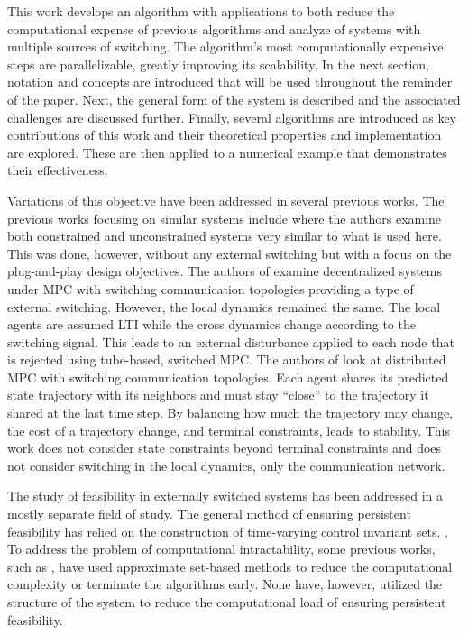 This work develops an algorithm with applications to both reduce the computational expense of previous algorithms and analyze of systems with multiple sources of switching. The algorithm's most computationally expensive steps are parallelizable, greatly improving its scalability. In the next section, notation and concepts are introduced that will be used throughout the reminder of the paper. Next, the general form of the system is described and the associated challenges are discussed further. Finally, several algorithms are introduced as key contributions of this work and their theoretical properties and implementation are explored. These are then applied to a numerical example that demonstrates their effectiveness. 

Variations of this objective have been addressed in several previous works. The previous works focusing on similar systems include \cite{Riverso2015} where the authors examine both constrained and unconstrained systems very similar to what is used here. This was done, however, without any external switching but with a focus on the plug-and-play design objectives. The authors of \cite{Ahandani2020} examine decentralized systems under MPC with switching communication topologies providing a type of external switching. However, the local dynamics remained the same. The local agents are assumed LTI while the cross dynamics change according to the switching signal. This leads to an external disturbance applied to each node that is rejected using tube-based, switched MPC. The authors of \cite{Li2020} look at distributed MPC with switching communication topologies. Each agent shares its predicted state trajectory with its neighbors and must stay ``close'' to the trajectory it shared at the last time step. By balancing how much the trajectory may change, the cost of a trajectory change, and terminal constraints, leads to stability. This work does not consider state constraints beyond terminal constraints and does not consider switching in the local dynamics, only the communication network. 

The study of feasibility in externally switched systems has been addressed in a mostly separate field of study. The general method of ensuring persistent feasibility has relied on the construction of time-varying control invariant sets. \cite{Santis2004, Zhang2016, Danielson2019}. To address the problem of computational intractability, some previous works, such as \cite{Santis2004}, have used approximate set-based methods to reduce the computational complexity or terminate the algorithms early. None have, however, utilized the structure of the system to reduce the computational load of ensuring persistent feasibility. 